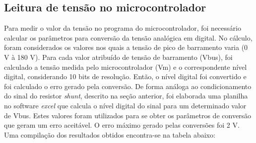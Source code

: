 \subsection{Leitura de tensão no microcontrolador}
Para medir o valor da tensão no programa do microcontrolador, foi necessário calcular os parâmetros para conversão da tensão analógica em digital. No cálculo, foram considerados os valores nos quais a tensão de pico de barramento varia (0 V à 180 V). Para cada valor atribuído de tensão de barramento (Vbus), foi calculado a tensão medida pelo microcontrolador (Vm) e o correspondente nível digital, considerando 10 bits de resolução. Então, o nível digital foi convertido e foi calculado o erro gerado pela conversão. De forma análoga ao condicionamento do sinal do resistor \textit{shunt}, descrito na seção anterior, foi elaborada uma planilha no software \textit{excel} que calcula o nível digital do sinal para um determinado valor de Vbus. Estes valores foram utilizados para se obter os parâmetros de conversão que geram um erro aceitável. O erro máximo gerado pelas conversões foi 2 V. Uma compilação dos resultados obtidos encontra-se na tabela abaixo:

